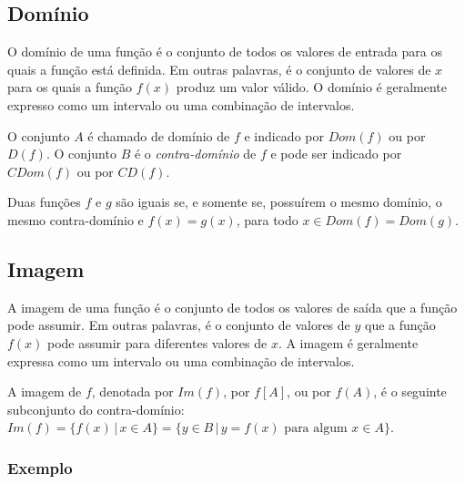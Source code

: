 \documentclass[12pt]{article}
\begin{document}
\subsection{Domínio}

O domínio de uma função é o conjunto de todos os valores de entrada para os quais a função está definida. Em outras palavras, é o conjunto de valores de $x$ para os quais a função $f(x)$ produz um valor válido.
O domínio é geralmente expresso como um intervalo ou uma combinação de intervalos.

O conjunto $A$ é chamado de domínio de $f$ e indicado por $Dom(f)$ ou por $D(f)$.
O conjunto $B$ é o \textit{contra-domínio} de $f$ e pode ser indicado por $CDom(f)$ ou por $CD(f)$.

Duas funções $f$ e $g$ são iguais se, e somente se, possuírem o mesmo domínio, o mesmo contra-domínio e $f(x) = g(x)$, para todo $x \in Dom(f) = Dom(g)$.

\subsection{Imagem}

A imagem de uma função é o conjunto de todos os valores de saída que a função pode assumir. Em outras palavras, é o conjunto de valores de $y$ que a função $f(x)$ pode assumir para diferentes valores de $x$.
A imagem é geralmente expressa como um intervalo ou uma combinação de intervalos.

A imagem de $f$, denotada por $Im(f)$, por $f[A]$, ou por $f(A)$, é o seguinte subconjunto do contra-domínio: $Im(f) = \{f(x) \,|\, x \in A\} = \{y \in B \,|\, y = f(x) \text{ para algum } x \in A\}$.

\pagebreak
\subsubsection{Exemplo}
\begin{center}
\end{center}
\end{document}
